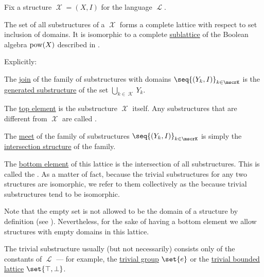 \begin{proposition}\label{thm:substructures_form_complete_lattice}
  Fix a structure \( \mscrX = (X, I) \) for the language \( \mscrL \).

  The set of all substructures of a \( \mscrX \) forms a complete lattice with respect to set inclusion of domains. It is isomorphic to a complete \hyperref[def:semilattice/submodel]{sublattice} of the Boolean algebra \( \operatorname{pow}(X) \) described in .

  Explicitly:
  \begin{thmenum}
     The \hyperref[def:semilattice/join]{join} of the family of substructures with domains \( \seq{ (Y_k, I) }_{k \in \mscrK} \) is the \hyperref[def:first_order_generated_substructure]{generated substructure} of the set \( \bigcup_{k \in \mscrK} Y_k \).

     The \hyperref[def:partially_ordered_set_extremal_points/top_and_bottom]{top element} is the substructure \( \mscrX \) itself. Any substructures that are different from \( \mscrX \) are called .

     The \hyperref[def:semilattice/meet]{meet} of the family of substructures \( \seq{ (Y_k, I) }_{k \in \mscrK} \) is simply the \hyperref[thm:first_order_substructure_properties/intersection]{intersection structure} of the family.

     The \hyperref[def:partially_ordered_set_extremal_points/top_and_bottom]{bottom element} of this lattice is the intersection of all substructures. This is called the . As a matter of fact, because the trivial substructures for any two structures are isomorphic, we refer to them collectively as the  because trivial substructures tend to be isomorphic.

    Note that the empty set is not allowed to be the domain of a structure by definition (see ). Nevertheless, for the sake of having a bottom element we allow structures with empty domains in this lattice.

    The trivial substructure usually (but not necessarily) consists only of the constants of \( \mscrL \) --- for example, the \hyperref[def:group/trivial]{trivial group} \( \set{ e } \) or the \hyperref[def:semilattice/trivial]{trivial bounded lattice} \( \set{ \top, \bot } \).
  \end{thmenum}
\end{proposition}
